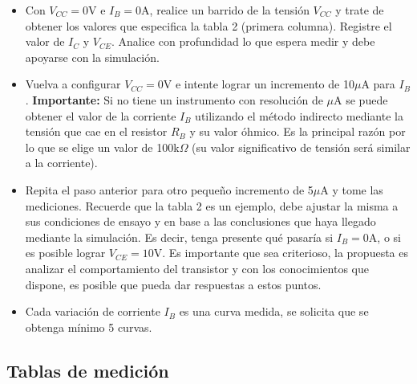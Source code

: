 \begin{itemize}
  \item Con $V_{CC}=0$V e $I_B=0$A, realice un barrido de la tensión $V_{CC}$ y trate de obtener los valores que especifica la tabla 2 (primera columna). Registre el valor de $I_C$ y $V_{CE}$. Analice con profundidad lo que espera medir y debe apoyarse con la simulación.
  \item Vuelva a configurar $V_{CC}=0$V e intente lograr un incremento de 10$\mu$A para $I_B$. \textbf{Importante:} Si no tiene un instrumento con resolución de $\mu$A se puede obtener el valor de la corriente $I_B$ utilizando el método indirecto mediante la tensión que cae en el resistor $R_B$ y su valor óhmico. Es la principal razón por lo que se elige un valor de 100k$\Omega$ (su valor significativo de tensión será similar a la corriente).
  \item Repita el paso anterior para otro pequeño incremento de 5$\mu$A y tome las mediciones. Recuerde que la tabla 2 es un ejemplo, debe ajustar la misma a sus condiciones de ensayo y en base a las conclusiones que haya llegado mediante la simulación. Es decir, tenga presente qué pasaría si $I_B=0$A, o si es posible lograr $V_{CE}=10$V. Es importante que sea criterioso, la propuesta es analizar el comportamiento del transistor y con los conocimientos que dispone, es posible que pueda dar respuestas a estos puntos.
  \item Cada variación de corriente $I_B$ es una curva medida, se solicita que se obtenga mínimo 5 curvas.
\end{itemize}

\subsection{Tablas de medición}

